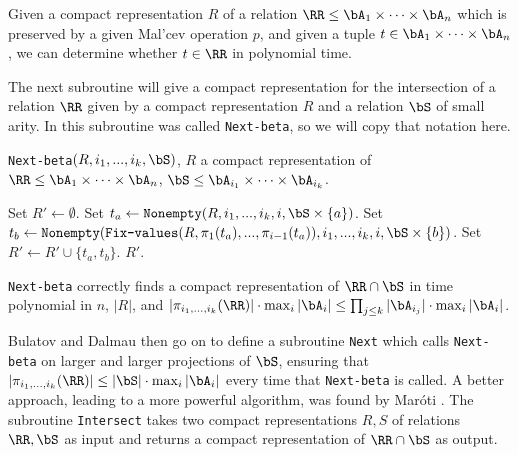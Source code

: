 \begin{cor} Given a compact representation $R$ of a relation $\RR \le \bA_1 \times \cdots \times \bA_n$ which is preserved by a given Mal'cev operation $p$, and given a tuple $t \in \bA_1 \times \cdots \times \bA_n$, we can determine whether $t \in \RR$ in polynomial time.
\end{cor}

The next subroutine will give a compact representation for the intersection of a relation $\RR$ given by a compact representation $R$ and a relation $\bS$ of small arity. In \cite{bulatov-dalmau-malcev} this subroutine was called \texttt{Next-beta}, so we will copy that notation here.

\begin{algorithm}
\caption{\texttt{Next-beta}$(R, i_1, ..., i_k, \bS)$, $R$ a compact representation of $\RR \le \bA_1\times \cdots\times \bA_n$, $\bS \le \bA_{i_1} \times \cdots \times \bA_{i_k}$.}
\begin{algorithmic}[1]
\State Set $R' \gets \emptyset$.
\State Set $t_a \gets \texttt{Nonempty}(R,i_1, ..., i_k,i,\bS\times \{a\})$.
\State Set $t_b \gets \texttt{Nonempty}(\texttt{Fix-values}(R, \pi_1(t_a), ..., \pi_{i-1}(t_a)), i_1, ..., i_k, i, \bS\times \{b\})$.
\State Set $R' \gets R' \cup \{t_a,t_b\}$.
\EndIf
\EndIf
\EndFor
\State \Return $R'$.
\end{algorithmic}
\end{algorithm}

\begin{prop} \texttt{Next-beta} correctly finds a compact representation of $\RR \cap \bS$ in time polynomial in $n$, $|R|$, and $|\pi_{i_1, ..., i_k}(\RR)|\cdot \max_i |\bA_i| \le \prod_{j \le k} |\bA_{i_j}|\cdot \max_i |\bA_i|$.
\end{prop}

Bulatov and Dalmau \cite{bulatov-dalmau-malcev} then go on to define a subroutine \texttt{Next} which calls \texttt{Next-beta} on larger and larger projections of $\bS$, ensuring that $|\pi_{i_1, ..., i_k}(\RR)| \le |\bS| \cdot \max_i |\bA_i|$ every time that \texttt{Next-beta} is called. A better approach, leading to a more powerful algorithm, was found by Mar\'oti \cite{malcev-on-top}. The subroutine \texttt{Intersect} takes two compact representations $R,S$ of relations $\RR, \bS$ as input and returns a compact representation of $\RR \cap \bS$ as output.

